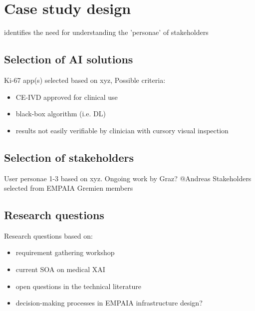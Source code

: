 \section{Case study design}
\label{sec:CaseStudyDesign}

\cite{chakraborti_emerging_2020} identifies the need for understanding the 'personae' of stakeholders

\subsection{Selection of AI solutions}

Ki-67 app(s) selected based on xyz, 
Possible criteria:

\begin{itemize}
    \item CE-IVD approved for clinical use
    \item black-box algorithm (i.e. DL)
    \item results not easily verifiable by clinician with cursory visual inspection
\end{itemize}


\subsection{Selection of stakeholders}

User personae 1-3 based on xyz. \cite{poceviciute_survey_2020} Ongoing work by Graz? @Andreas
Stakeholders selected from EMPAIA Gremien members

\subsection{Research questions}

Research questions based on:
\begin{itemize}
\item requirement gathering workshop
\item current SOA on medical XAI
\item open questions in the technical literature
\item decision-making processes in EMPAIA infrastructure design?
\end{itemize}

